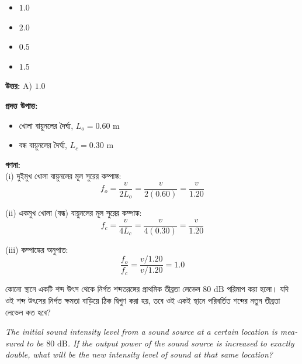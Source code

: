 \documentclass[12pt, a4paper]{article}
\begin{document}
\begin{itemize}[label={}, leftmargin=1cm, itemsep=0.5em]
    \item[\textbf{A)}] $1.0$
    \item[\textbf{B)}] $2.0$
    \item[\textbf{C)}] $0.5$
    \item[\textbf{D)}] $1.5$
\end{itemize}

\vspace{0.5em}
\begin{tcolorbox}[answerbox]
    \textbf{\color{success} উত্তর:} A) $1.0$
\end{tcolorbox}
\vspace{1em}

\begin{tcolorbox}[solutionbox={সমাধান (Solution)}]
    \noindent
    \textbf{প্রদত্ত উপাত্ত:}
    \begin{itemize}[leftmargin=1.5em, itemsep=0.2em]
        \item খোলা বায়ুনলের দৈর্ঘ্য, $L_o = 0.60\text{ m}$
        \item বন্ধ বায়ুনলের দৈর্ঘ্য, $L_c = 0.30\text{ m}$
    \end{itemize}

    \vspace{0.6em}
    \noindent\textbf{গণনা:} \\
    (i) দুইমুখ খোলা বায়ুনলের মূল সুরের কম্পাঙ্ক:
    \[ f_o = \frac{v}{2 L_o} = \frac{v}{2(0.60)} = \frac{v}{1.20} \]
    
    (ii) একমুখ খোলা (বন্ধ) বায়ুনলের মূল সুরের কম্পাঙ্ক:
    \[ f_c = \frac{v}{4 L_c} = \frac{v}{4(0.30)} = \frac{v}{1.20} \]
    
    (iii) কম্পাঙ্কের অনুপাত:
    \[ \frac{f_o}{f_c} = \frac{v / 1.20}{v / 1.20} = \mathbf{1.0} \]
\end{tcolorbox}


\begin{tcolorbox}[questionbox={প্রশ্ন (Question) 7}]
    \noindent
    কোনো স্থানে একটি শব্দ উৎস থেকে নির্গত শব্দতরঙ্গের প্রাথমিক তীব্রতা লেভেল $80\text{ dB}$ পরিমাপ করা হলো। যদি ওই শব্দ উৎসের নির্গত ক্ষমতা বাড়িয়ে ঠিক দ্বিগুণ করা হয়, তবে ওই একই স্থানে পরিবর্তিত শব্দের নতুন তীব্রতা লেভেল কত হবে?
    
    \vspace{0.8em}
    \begin{english}
    \noindent\textit{\color{darkgray}
    The initial sound intensity level from a sound source at a certain location is measured to be $80\text{ dB}$. If the output power of the sound source is increased to exactly double, what will be the new intensity level of sound at that same location?
    }
    \end{english}
\end{tcolorbox}
\end{document}
